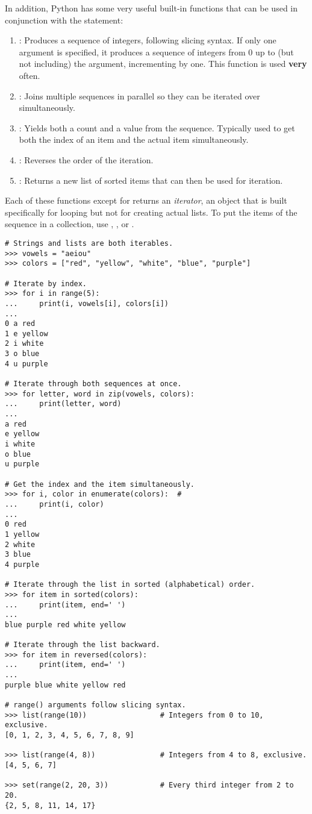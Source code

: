 In addition, Python has some very useful built-in functions that can be used in conjunction with the  statement:
\begin{enumerate}
\item {}: Produces a sequence of integers, following slicing syntax.
If only one argument is specified, it produces a sequence of integers from 0 up to (but not including) the argument, incrementing by one. 
This function is used \textbf{very} often.
\item {}: Joins multiple sequences in parallel so they can be iterated over simultaneously.
\item {}: Yields both a count and a value from the sequence. Typically used to get both the index of an item and the actual item simultaneously.
\item {}: Reverses the order of the iteration.
\item {}: Returns a new list of sorted items that can then be used for iteration.
\end{enumerate}
Each of these functions except for  returns an \emph{iterator}, an object that is built specifically for looping but not for creating actual lists.
To put the items of the sequence in a collection, use , , or .

\begin{lstlisting}
# Strings and lists are both iterables.
>>> vowels = "aeiou"
>>> colors = ["red", "yellow", "white", "blue", "purple"]

# Iterate by index.
>>> for i in range(5):
...     print(i, vowels[i], colors[i])
...
0 a red
1 e yellow
2 i white
3 o blue
4 u purple

# Iterate through both sequences at once.
>>> for letter, word in zip(vowels, colors):
...     print(letter, word)
...
a red
e yellow
i white
o blue
u purple

# Get the index and the item simultaneously.
>>> for i, color in enumerate(colors):  #
...     print(i, color)
...
0 red
1 yellow
2 white
3 blue
4 purple

# Iterate through the list in sorted (alphabetical) order.
>>> for item in sorted(colors):
...     print(item, end=' ')
...
blue purple red white yellow

# Iterate through the list backward.
>>> for item in reversed(colors):
...     print(item, end=' ')
...
purple blue white yellow red

# range() arguments follow slicing syntax.
>>> list(range(10))                 # Integers from 0 to 10, exclusive.
[0, 1, 2, 3, 4, 5, 6, 7, 8, 9]

>>> list(range(4, 8))               # Integers from 4 to 8, exclusive.
[4, 5, 6, 7]

>>> set(range(2, 20, 3))            # Every third integer from 2 to 20.
{2, 5, 8, 11, 14, 17}
\end{lstlisting}

